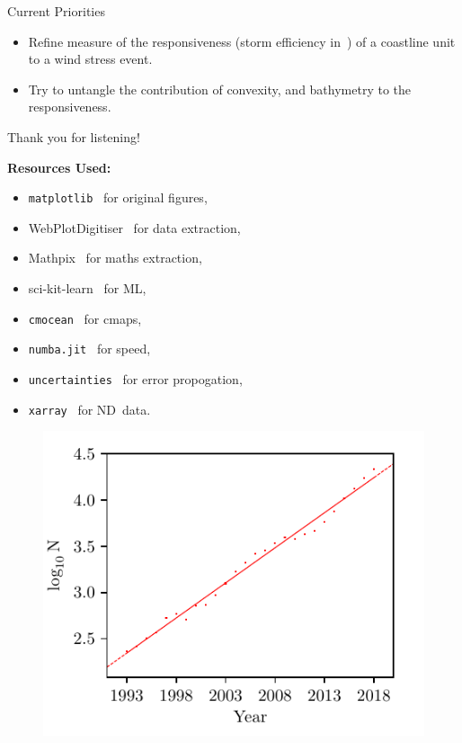 \documentclass[usenames, dvipsnames]{beamer}
\begin{document}
\begin{frame}{Current Priorities}
\begin{itemize}
\item Refine measure of the responsiveness  (storm efficiency in~\cite{ZannaPreprint})
      of a coastline unit to a wind stress event.
\item Try to untangle the contribution of
	    convexity, and bathymetry to the responsiveness.
\end{itemize}
\end{frame}

\begin{frame}{Thank you for listening!}
      \begin{minipage}{1.1\textwidth}
   \hspace{-20pt}\begin{minipage}{0.45\textwidth}
   \textbf{Resources Used:}
   \begin{itemize}
\item \texttt{matplotlib}~\cite{Hunter:2007} for original figures,
\item WebPlotDigitiser~\cite{WebPlotDigitiser} for data extraction,
\item Mathpix~\cite{mathpix} for maths extraction,
\item sci-kit-learn~\cite{scikit-learn}  for ML,
\item \texttt{cmocean}~\cite{thyng2016true}
for cmaps,
\item \texttt{numba.jit}~\cite{lam2015numba} for speed,
\item \texttt{uncertainties}~\cite{lebigot2010uncertainties} for error propogation,
\item \texttt{xarray}~\cite{hoyer2017xarray} for ND~data.
\end{itemize}
    \end{minipage}\hspace{10pt}
      \begin{minipage}{0.50\textwidth}
    \begin{figure}
            \includegraphics[width=1\linewidth]{images/example-images/Compared_O2.pdf}

\end{figure}
\end{minipage}
\end{minipage}
\end{frame}
\end{document}
